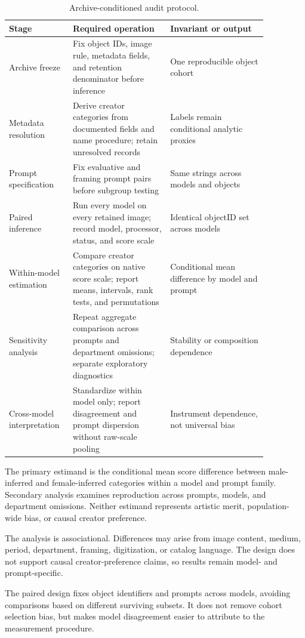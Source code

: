 \documentclass[pdflatex,sn-basic,Numbered]{sn-jnl}
\begin{document}
\begin{table}[htbp]
\centering
\caption{Archive-conditioned audit protocol.}
\label{tab:protocol}
\scriptsize
\begin{tabular}{p{0.18\linewidth}p{0.34\linewidth}p{0.34\linewidth}}
\toprule
Stage & Required operation & Invariant or output \\
\midrule
Archive freeze & Fix object IDs, image rule, metadata fields, and retention denominator before inference & One reproducible object cohort \\
Metadata resolution & Derive creator categories from documented fields and name procedure; retain unresolved records & Labels remain conditional analytic proxies \\
Prompt specification & Fix evaluative and framing prompt pairs before subgroup testing & Same strings across models and objects \\
Paired inference & Run every model on every retained image; record model, processor, status, and score scale & Identical objectID set across models \\
Within-model estimation & Compare creator categories on native score scale; report means, intervals, rank tests, and permutations & Conditional mean difference by model and prompt \\
Sensitivity analysis & Repeat aggregate comparison across prompts and department omissions; separate exploratory diagnostics & Stability or composition dependence \\
Cross-model interpretation & Standardize within model only; report disagreement and prompt dispersion without raw-scale pooling & Instrument dependence, not universal bias \\
\bottomrule
\end{tabular}
\end{table}

The primary estimand is the conditional mean score difference between male-inferred and female-inferred categories within a model and prompt family. Secondary analysis examines reproduction across prompts, models, and department omissions. Neither estimand represents artistic merit, population-wide bias, or causal creator preference.

The analysis is associational. Differences may arise from image content, medium, period, department, framing, digitization, or catalog language. The design does not support causal creator-preference claims, so results remain model- and prompt-specific.

The paired design fixes object identifiers and prompts across models, avoiding comparisons based on different surviving subsets. It does not remove cohort selection bias, but makes model disagreement easier to attribute to the measurement procedure.
\end{document}
